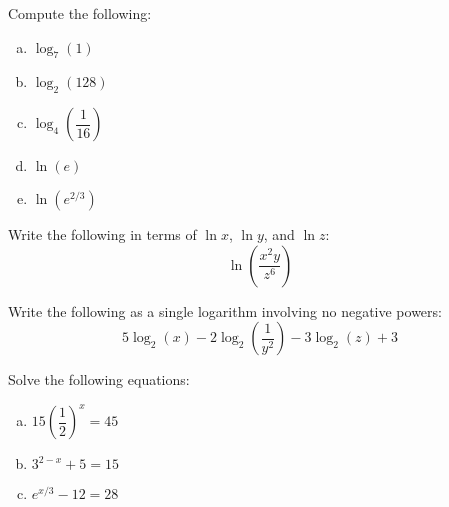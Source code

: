 \documentclass[11pt,letterpaper]{article}
\begin{document}

 Compute the following:
	\begin{enumerate}[(a)]
	\item $\log_7(1)$
	\item $\log_2(128)$
	\item $\log_4 \left( \dfrac{1}{16} \right)$
	\item $\ln(e)$
	\item $\ln(e^{2/3})$
	\end{enumerate}



\newpage



 Write the following in terms of $\ln x$, $\ln y$, and $\ln z$:
	\[
	\ln \left( \dfrac{x^2 y}{z^6} \right)
	\]



\newpage



 Write the following as a single logarithm involving no negative powers:
	\[
	5\log_2(x) - 2\log_2 \left( \dfrac{1}{y^2} \right) - 3\log_2(z) + 3
	\]



\newpage



 Solve the following equations:
	\begin{enumerate}[(a)]
	\item $15 \left( \dfrac{1}{2} \right)^x= 45$
	\item $3^{2 - x} + 5= 15$
	\item $e^{x/3} - 12= 28$
	\end{enumerate}
\end{document}
